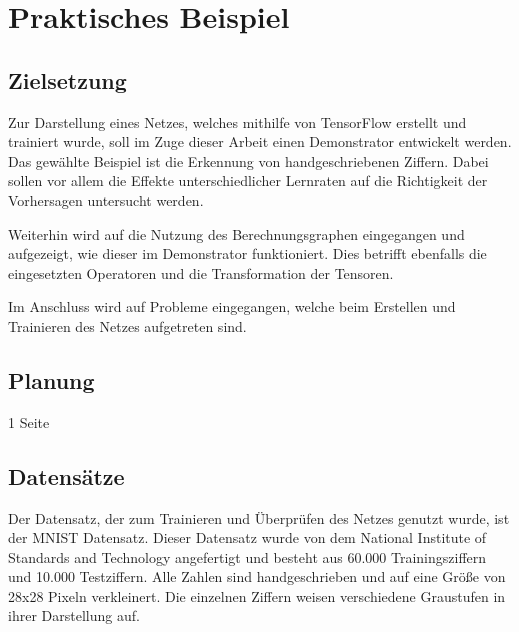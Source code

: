 \chapter{Praktisches Beispiel}
\label{chap:praktischesBeispiel}
\section{Zielsetzung}
\label{sec:zielsetzung}
\printsubchapterauthor{\authorMarco}
Zur Darstellung eines Netzes, welches mithilfe von TensorFlow erstellt und trainiert wurde, soll im Zuge dieser Arbeit einen Demonstrator entwickelt werden. Das gewählte Beispiel ist die Erkennung von handgeschriebenen Ziffern. Dabei sollen vor allem die Effekte unterschiedlicher Lernraten auf die Richtigkeit der Vorhersagen untersucht werden.

Weiterhin wird auf die Nutzung des Berechnungsgraphen eingegangen und aufgezeigt, wie dieser im Demonstrator funktioniert. Dies betrifft ebenfalls die eingesetzten Operatoren und die Transformation der Tensoren.

Im Anschluss wird auf Probleme eingegangen, welche beim Erstellen und Trainieren des Netzes aufgetreten sind.

\section{Planung}
\label{sec:planung}
\printsubchapterauthor{\authorNiklas}
1 Seite

\section{Datensätze}
\label{sec:datensaetze}
\printsubchapterauthor{\authorMarco}
Der Datensatz, der zum Trainieren und Überprüfen des Netzes genutzt wurde, ist der MNIST Datensatz. Dieser Datensatz wurde von dem National Institute of Standards and Technology angefertigt und besteht aus 60.000 Trainingsziffern und 10.000 Testziffern. Alle Zahlen sind handgeschrieben und auf eine Größe von 28x28 Pixeln verkleinert. Die einzelnen Ziffern weisen verschiedene Graustufen in ihrer Darstellung auf.

